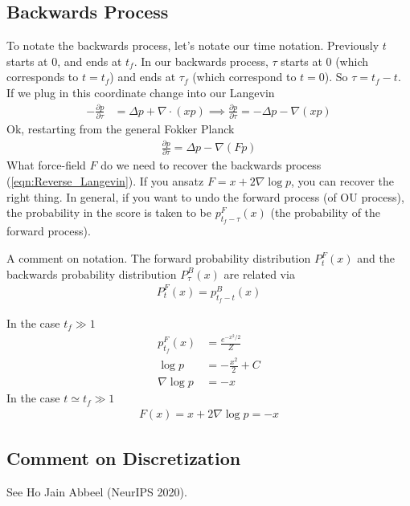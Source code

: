 \subsection{Backwards Process}
To notate the backwards process, let's notate our time notation. Previously $t$ starts at 0, and ends at $t_f$. In our backwards process, $\tau$ starts at 0 (which corresponds to $t=t_f$) and ends at $\tau_f$ (which correspond to $t=0$). So $\tau = t_f -t$. If we plug in this coordinate change into our Langevin
\begin{align}
	-\frac{\partial p}{\partial \tau} & = \Delta p + \nabla \cdot(x p) \implies \frac{\partial p}{\partial \tau}  = -\Delta p - \nabla (x p) \label{eqn:Reverse_Langevin}
\end{align}
Ok, restarting from the general Fokker Planck
\begin{align}
	\frac{\partial p}{\partial \tau} = \Delta p - \nabla (F p)
\end{align}
What force-field $F$ do we need to recover the backwards process (\ref{eqn:Reverse_Langevin}). If you ansatz $F = x + 2 \nabla \log p$, you can recover the right thing. In general, if you want to undo the forward process (of OU process), the probability in the score is taken to be $p_{t_f-\tau }^F(x)$ (the probability of the forward process).
\begin{sidework}
	A comment on notation. The forward probability distribution $P_t^F(x)$ and the backwards probability distribution $P_\tau^B(x)$ are related via
	\begin{align}
		P_t^F(x) = p_{t_f - t}^B(x)
	\end{align}
\end{sidework}
In the case $t_f \gg 1$
\begin{align}
	p_{t_f}^F (x) & = \frac{e^{-x^2/2}}{Z}\\
	\log p & = - \frac{x^2}{2} + C\\
	\nabla \log p & = -x
\end{align}
In the case $t \simeq t_f \gg 1$
\begin{align}
	F(x) = x + 2 \nabla \log p = -x
\end{align}
\subsection{Comment on Discretization}
See Ho Jain Abbeel (NeurIPS 2020).


